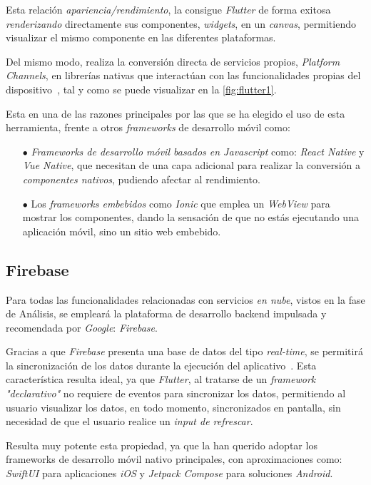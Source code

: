 Esta relación \textit{apariencia/rendimiento}, la consigue \textit{Flutter} de forma exitosa
\textit{renderizando} directamente sus componentes, 
\textit{widgets}, en un \textit{canvas}, permitiendo visualizar el mismo componente en las diferentes plataformas.

Del mismo modo, realiza la conversión directa de servicios propios, \textit{Platform Channels}, en librerías nativas que
interactúan con las funcionalidades propias del dispositivo~\cite{leler2019s}, 
tal y como se puede visualizar en la \autoref{fig:flutter1}.

Esta en una de las razones principales por las que se ha elegido el uso de esta herramienta, frente a otros 
\textit{frameworks} de desarrollo móvil como: 

\begin{itemize}
    \item[$\bullet$] \textit{Frameworks de desarrollo móvil basados en Javascript} como: \textit{React Native} y 
    \textit{Vue Native}, que necesitan de una
    capa adicional para realizar la conversión a \textit{componentes nativos}, pudiendo afectar al rendimiento.
    \item[$\bullet$] Los \textit{frameworks embebidos} como
    \textit{Ionic} que emplea un \textit{WebView} para mostrar los componentes, dando la sensación de que no estás ejecutando
    una aplicación móvil, sino un sitio web embebido.
 \end{itemize}

 \subsection{Firebase}
 Para todas las funcionalidades relacionadas con servicios \textit{en nube}, vistos en la fase de Análisis,
 se empleará la plataforma de desarrollo backend impulsada y recomendada por \textit{Google}: \textit{Firebase}.

Gracias a que \textit{Firebase} presenta una base de datos del tipo \textit{real-time}, se permitirá 
la sincronización de los datos durante la ejecución del
aplicativo~\cite{khawas2018application}. Esta característica resulta ideal, ya que
\textit{Flutter}, al tratarse de un \textit{framework "declarativo"} no requiere de eventos para
sincronizar los datos, permitiendo al usuario visualizar los datos, en todo momento, sincronizados en pantalla,
sin necesidad de que el usuario realice un \textit{input de refrescar}.

Resulta muy potente esta propiedad, ya que la han querido adoptar los frameworks de desarrollo móvil nativo principales,
con aproximaciones como: \textit{SwiftUI} para aplicaciones \textit{iOS} y \textit{Jetpack Compose} para soluciones \textit{Android}.

